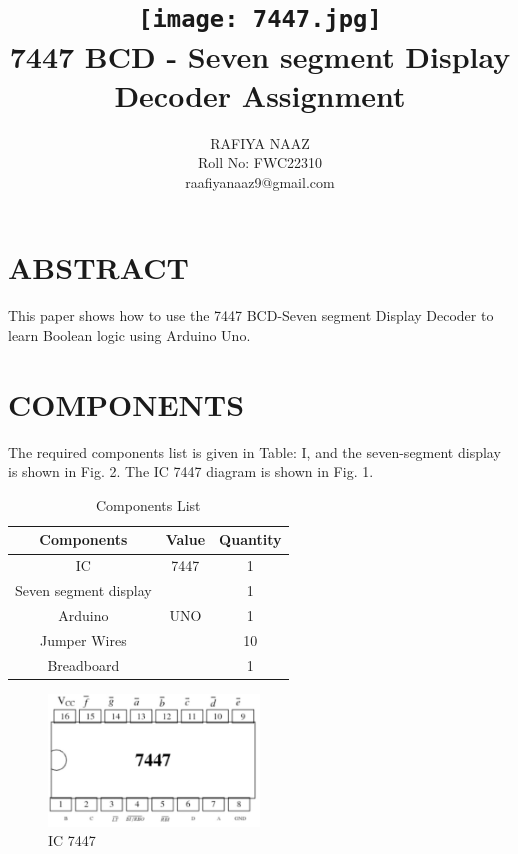 \documentclass[conference]{IEEEtran}
\title{
\vspace{1cm}
{\texttt{[image: 7447.jpg]} \\ 
7447 BCD - Seven segment Display Decoder Assignment} }
\author{RAFIYA NAAZ\\ Roll No: FWC22310 \\raafiyanaaz9@gmail.com}
\begin{document}
\maketitle

\section{ABSTRACT}
This paper shows how to use the 7447 BCD-Seven segment Display Decoder to learn Boolean logic using Arduino Uno.
\section{COMPONENTS}
The required components list is given in Table: I, and the seven-segment display is shown in Fig. 2. The IC 7447 diagram is shown in Fig. 1.
\vspace{0.3cm}

\begin{table}[htbp]
\centering
\begin{tabular}{| c | c | c |}
\hline
Components & Value & Quantity \\
\hline
IC & 7447 & 1 \\
\hline
Seven segment display & & 1 \\
\hline
Arduino & UNO & 1 \\
\hline
Jumper Wires & & 10 \\
\hline
Breadboard & & 1 \\
\hline
\end{tabular}
\vspace{0.3cm}
\caption{\label{tab:widgets} Components List}
\end{table}

\begin{figure}[htbp]                           
\centering                            
\includegraphics[width=0.5\textwidth]{7447022.jpg}                      
\caption{\label{fig-1:Gates} IC 7447}           
\end{figure}
\end{document}
